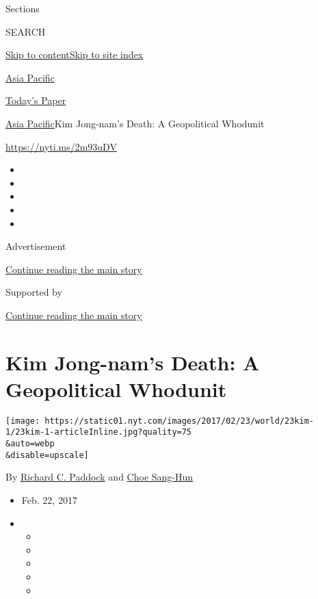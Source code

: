 Sections

SEARCH

\protect\hyperlink{site-content}{Skip to
content}\protect\hyperlink{site-index}{Skip to site index}

\href{https://www.nytimes.com/section/world/asia}{Asia Pacific}

\href{https://myaccount.nytimes.com/auth/login?response_type=cookie\&client_id=vi}{}

\href{https://www.nytimes.com/section/todayspaper}{Today's Paper}

\href{/section/world/asia}{Asia Pacific}\textbar{}Kim Jong-nam's Death:
A Geopolitical Whodunit

\url{https://nyti.ms/2m93uDV}

\begin{itemize}
\item
\item
\item
\item
\item
\end{itemize}

Advertisement

\protect\hyperlink{after-top}{Continue reading the main story}

Supported by

\protect\hyperlink{after-sponsor}{Continue reading the main story}

\hypertarget{kim-jong-nams-death-a-geopolitical-whodunit}{%
\section{Kim Jong-nam's Death: A Geopolitical
Whodunit}\label{kim-jong-nams-death-a-geopolitical-whodunit}}

\texttt{[image: https://static01.nyt.com/images/2017/02/23/world/23kim-1/23kim-1-articleInline.jpg?quality=75\\\&auto=webp\\\&disable=upscale]}

By \href{https://www.nytimes.com/by/richard-c-paddock}{Richard C.
Paddock} and \href{http://www.nytimes.com/by/choe-sang-hun}{Choe
Sang-Hun}

\begin{itemize}
\item
  Feb. 22, 2017
\item
  \begin{itemize}
  \item
  \item
  \item
  \item
  \item
  \end{itemize}
\end{itemize}

